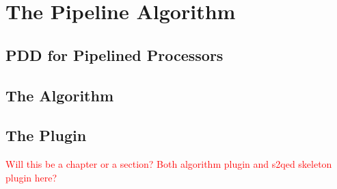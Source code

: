 \chapter{The Pipeline Algorithm}
\label{chapter:algorithm}

\section{PDD for Pipelined Processors}

\section{The Algorithm}

\section{The Plugin}

\textcolor{red}{Will this be a chapter or a section? Both algorithm plugin and s2qed skeleton plugin here?}